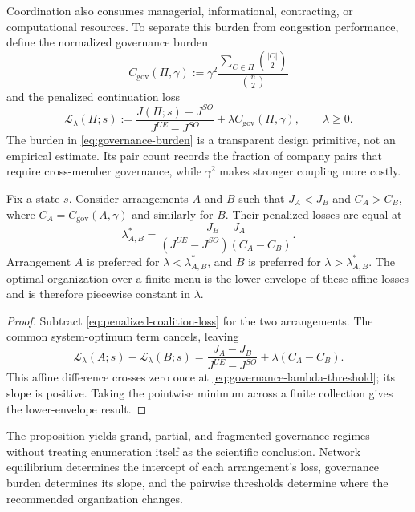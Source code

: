 Coordination also consumes managerial, informational, contracting, or
computational resources. To separate this burden from congestion performance,
define the normalized governance burden
\begin{equation}\label{eq:governance-burden}
 C_{\mathrm{gov}}(\Pi,\gamma)
 :=\gamma^2\frac{\sum_{C\in\Pi}\binom{|C|}{2}}{\binom n2}
\end{equation}
and the penalized continuation loss
\begin{equation}\label{eq:penalized-coalition-loss}
 \mathcal L_\lambda(\Pi;s)
 :=\frac{J(\Pi;s)-J^{SO}}{J^{UE}-J^{SO}}
 +\lambda C_{\mathrm{gov}}(\Pi,\gamma),
 \qquad \lambda\geq0.
\end{equation}
The burden in \eqref{eq:governance-burden} is a transparent design primitive,
not an empirical estimate. Its pair count records the fraction of company
pairs that require cross-member governance, while $\gamma^2$ makes stronger
coupling more costly.

\begin{proposition}\label{prop:governance-cost-threshold}
Fix a state $s$. Consider arrangements $A$ and $B$ such that $J_A<J_B$ and
$C_A>C_B$, where $C_A=C_{\mathrm{gov}}(A,\gamma)$ and similarly for $B$. Their
penalized losses are equal at
\begin{equation}\label{eq:governance-lambda-threshold}
 \lambda_{A,B}^*
 =\frac{J_B-J_A}{(J^{UE}-J^{SO})(C_A-C_B)}.
\end{equation}
Arrangement $A$ is preferred for $\lambda<\lambda_{A,B}^*$, and $B$ is
preferred for $\lambda>\lambda_{A,B}^*$. The optimal organization over a
finite menu is the lower envelope of these affine losses and is therefore
piecewise constant in $\lambda$.
\end{proposition}

\begin{proof}
Subtract \eqref{eq:penalized-coalition-loss} for the two arrangements. The
common system-optimum term cancels, leaving
\[
 \mathcal L_\lambda(A;s)-\mathcal L_\lambda(B;s)
 =\frac{J_A-J_B}{J^{UE}-J^{SO}}+\lambda(C_A-C_B).
\]
This affine difference crosses zero once at
\eqref{eq:governance-lambda-threshold}; its slope is positive. Taking the
pointwise minimum across a finite collection gives the lower-envelope result.
\end{proof}

The proposition yields grand, partial, and fragmented governance regimes
without treating enumeration itself as the scientific conclusion. Network
equilibrium determines the intercept of each arrangement's loss, governance
burden determines its slope, and the pairwise thresholds determine where the
recommended organization changes.

